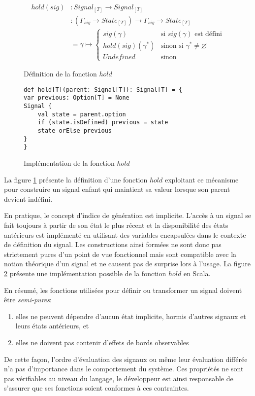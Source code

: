 \begin{figure}
	\begin{align*}
		hold (sig) &\colon Signal_{[T]} \to Signal_{[T]} \\
          &\colon (\Gamma_{sig} \to State_{[T]}) \to \Gamma_{sig} \to State_{[T]} \\
          &= \gamma \mapsto \begin{cases}
		           		sig(\gamma) & \text{si } sig(\gamma) \text{ est défini} \\
		           		hold(sig)(\gamma^*) & \text{sinon si } \gamma^* \ne \varnothing \\
		           		Undefined & \text{sinon}
          \end{cases}
	\end{align*}
	\caption{Définition de la fonction $hold$}
	\label{fig:sig-hold}
\end{figure}

\begin{figure}
	\begin{lstlisting}
def hold[T](parent: Signal[T]): Signal[T] = {
var previous: Option[T] = None
Signal {
	val state = parent.option
	if (state.isDefined) previous = state
	state orElse previous
}
}
	\end{lstlisting}
	\caption{Implémentation de la fonction $hold$}
	\label{fig:sig-hold-scala}
\end{figure}

La figure \ref{fig:sig-hold} présente la définition d'une fonction $hold$ exploitant ce mécanisme pour construire un signal enfant qui maintient sa valeur lorsque son parent devient indéfini.

En pratique, le concept d'indice de génération est implicite. L'accès à un signal se fait toujours à partir de son état le plus récent et la disponibilité des états antérieurs est implémenté en utilisant des variables encapsulées dans le contexte de définition du signal. Les constructions ainsi formées ne sont donc pas strictement pures d'un point de vue fonctionnel mais sont compatible avec la notion théorique d'un signal et ne causent pas de surprise lors à l'usage. La figure \ref{fig:sig-hold-scala} présente une implémentation possible de la fonction $hold$ en Scala.

En résumé, les fonctions utilisées pour définir ou transformer un signal doivent être \emph{semi-pures}:
\begin{enumerate}
	\item elles ne peuvent dépendre d'aucun état implicite, hormis d'autres signaux et leurs états antérieurs, et
	\item elles ne doivent pas contenir d'effets de bords observables
\end{enumerate}
De cette façon, l'ordre d'évaluation des signaux ou même leur évaluation différée n'a pas d'importance dans le comportement du système. Ces propriétés ne sont pas vérifiables au niveau du langage, le développeur est ainsi responsable de s'assurer que ses fonctions soient conformes à ces contraintes.


